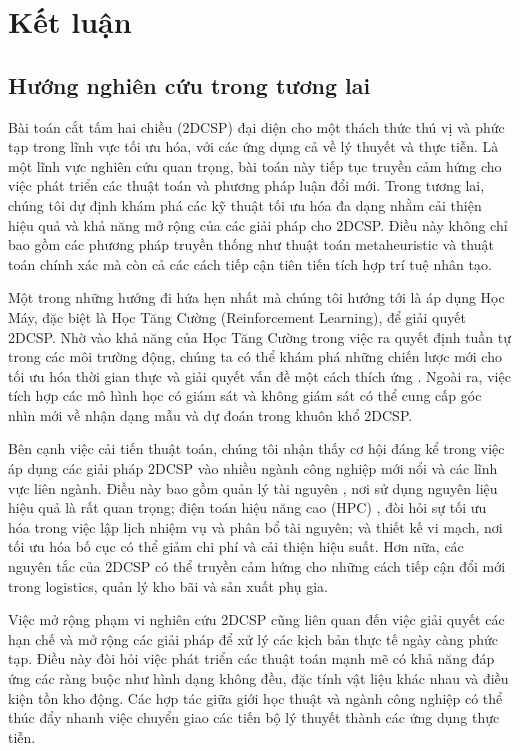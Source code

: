 \section{Kết luận}
\subsection{Hướng nghiên cứu trong tương lai}

\hspace{0.5cm}Bài toán cắt tấm hai chiều (2DCSP) đại diện cho một thách thức thú vị và phức tạp trong lĩnh vực tối ưu hóa, với các ứng dụng cả về lý thuyết và thực tiễn. Là một lĩnh vực nghiên cứu quan trọng, bài toán này tiếp tục truyền cảm hứng cho việc phát triển các thuật toán và phương pháp luận đổi mới. Trong tương lai, chúng tôi dự định khám phá các kỹ thuật tối ưu hóa đa dạng nhằm cải thiện hiệu quả và khả năng mở rộng của các giải pháp cho 2DCSP. Điều này không chỉ bao gồm các phương pháp truyền thống như thuật toán metaheuristic và thuật toán chính xác mà còn cả các cách tiếp cận tiên tiến tích hợp trí tuệ nhân tạo.

Một trong những hướng đi hứa hẹn nhất mà chúng tôi hướng tới là áp dụng Học Máy, đặc biệt là Học Tăng Cường (Reinforcement Learning), để giải quyết 2DCSP. Nhờ vào khả năng của Học Tăng Cường trong việc ra quyết định tuần tự trong các môi trường động, chúng ta có thể khám phá những chiến lược mới cho tối ưu hóa thời gian thực và giải quyết vấn đề một cách thích ứng \cite{RL}. Ngoài ra, việc tích hợp các mô hình học có giám sát và không giám sát có thể cung cấp góc nhìn mới về nhận dạng mẫu và dự đoán trong khuôn khổ 2DCSP.

Bên cạnh việc cải tiến thuật toán, chúng tôi nhận thấy cơ hội đáng kể trong việc áp dụng các giải pháp 2DCSP vào nhiều ngành công nghiệp mới nổi và các lĩnh vực liên ngành. Điều này bao gồm quản lý tài nguyên \cite{mao2017resource}, nơi sử dụng nguyên liệu hiệu quả là rất quan trọng; điện toán hiệu năng cao (HPC) \cite{le2023irls}, đòi hỏi sự tối ưu hóa trong việc lập lịch nhiệm vụ và phân bổ tài nguyên; và thiết kế vi mạch, nơi tối ưu hóa bố cục có thể giảm chi phí và cải thiện hiệu suất. Hơn nữa, các nguyên tắc của 2DCSP có thể truyền cảm hứng cho những cách tiếp cận đổi mới trong logistics, quản lý kho bãi và sản xuất phụ gia.

Việc mở rộng phạm vi nghiên cứu 2DCSP cũng liên quan đến việc giải quyết các hạn chế và mở rộng các giải pháp để xử lý các kịch bản thực tế ngày càng phức tạp. Điều này đòi hỏi việc phát triển các thuật toán mạnh mẽ có khả năng đáp ứng các ràng buộc như hình dạng không đều, đặc tính vật liệu khác nhau và điều kiện tồn kho động. Các hợp tác giữa giới học thuật và ngành công nghiệp có thể thúc đẩy nhanh việc chuyển giao các tiến bộ lý thuyết thành các ứng dụng thực tiễn.

